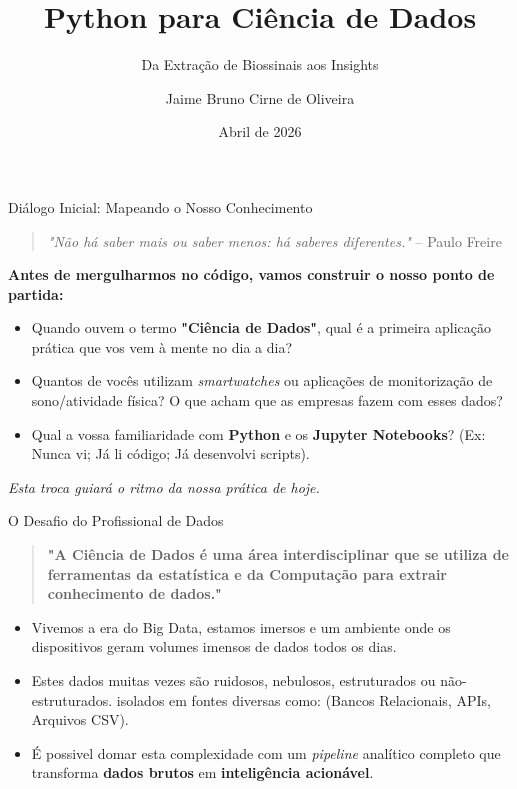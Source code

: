 \documentclass[10pt, aspectratio=169]{beamer}
\title{Python para Ciência de Dados}
\subtitle{Da Extração de Biossinais aos Insights}
\author{Jaime Bruno Cirne de Oliveira}
\date{Abril de 2026}
\begin{document}
\maketitle

\begin{frame}{Diálogo Inicial: Mapeando o Nosso Conhecimento}
    \begin{quote}
        \textit{"Não há saber mais ou saber menos: há saberes diferentes."} -- Paulo Freire
    \end{quote}
    \vspace{0.5cm}
    \textbf{Antes de mergulharmos no código, vamos construir o nosso ponto de partida:}
    \begin{itemize}
        \item Quando ouvem o termo \textbf{"Ciência de Dados"}, qual é a primeira aplicação prática que vos vem à mente no dia a dia?
        \item Quantos de vocês utilizam \textit{smartwatches} ou aplicações de monitorização de sono/atividade física? O que acham que as empresas fazem com esses dados?
        \item Qual a vossa familiaridade com \textbf{Python} e os \textbf{Jupyter Notebooks}? (Ex: Nunca vi; Já li código; Já desenvolvi scripts).
    \end{itemize}
    \vspace{0.3cm}
    \begin{flushright}
        \textit{\small *Esta troca guiará o ritmo da nossa prática de hoje.}
    \end{flushright}
\end{frame}

\begin{frame}{O Desafio do Profissional de Dados}
    \begin{quotation}
        \textbf{"A Ciência de Dados é uma área interdisciplinar que se utiliza de ferramentas da estatística e da Computação para extrair conhecimento de dados."}
    \end{quotation}
    \vspace{0.5cm}
    \begin{itemize}
        \item Vivemos a era do Big Data, estamos imersos e um ambiente onde os dispositivos geram volumes imensos de dados todos os dias.
        \item Estes dados muitas vezes são ruidosos, nebulosos, estruturados ou não-estruturados. isolados em fontes diversas como: (Bancos Relacionais, APIs, Arquivos CSV).
        \item É possivel domar esta complexidade com um \textit{pipeline} analítico completo que transforma \textbf{dados brutos} em \textbf{inteligência acionável}.    
    \end{itemize}
    
\end{frame}
\end{document}
